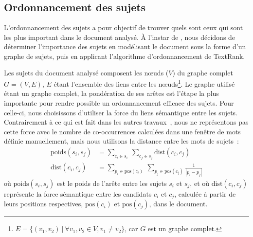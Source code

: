   \subsection{Ordonnancement des sujets}
  \label{subsec:ordonnancement_des_sujets}
    L'ordonnancement des sujets a pour objectif de trouver quels sont ceux qui
    sont les plus important dans le document analysé. À l'instar de
    , nous décidons de déterminer l'importance des
    sujets en modélisant le document sous la forme d'un graphe de sujets, puis
    en applicant l'algorithme d'ordonnancement de TextRank.

    Les sujets du document analysé composent les n\oe{}uds ($V$) du graphe
    complet $G = (V, E)$, $E$ étant l'ensemble des liens entre les
    n\oe{}uds\footnote{$E = \{(v_1, v_2)\ |\ \forall{v_1, v_2 \in V}, v_1 \neq v_2\}$,
    car $G$ est un graphe complet.}. Le graphe utilisé étant un graphe complet,
    la pondération de ses arêtes est l'étape la plus importante pour rendre
    possible un ordonnancement efficace des sujets. Pour celle-ci, nous 
    choisissons d'utiliser la force du liens sémantique entre les sujets.
    Contrairement à ce qui est fait dans les autres
    travaux~\cite{wan2008expandrank,tsatsaronis2010semanticrank,liu2010topicalpagerank},
    nous ne représentons pas cette force avec le nombre de co-occurrences
    calculées dans une fenêtre de mots définie manuellement, mais nous utilisons
    la distance entre les mots de sujets~:
    \begin{align}
      \text{poids}(s_i, s_j) &= \sum_{c_i \in s_i}\ \sum_{c_j \in s_j} \text{dist}(c_i, c_j) \label{math:ponderation}\\
      \text{dist}(c_i, c_j) &= \sum_{p_i \in \text{pos}(c_i)}\ \sum_{p_j \in \text{pos}(c_j)} \frac{1}{|p_i - p_j|} \label{math:distance}
    \end{align}
    où $\text{poids}(s_i, s_j)$ est le poids de l'arête entre les sujets $s_i$
    et $s_j$, et où $\text{dist}(c_i, c_j)$ représente la force sémantique entre
    les candidats $c_i$ et $c_j$, calculée à partir de leurs positions
    respectives, $\text{pos}(c_i)$ et $\text{pos}(c_j)$, dans le document.

